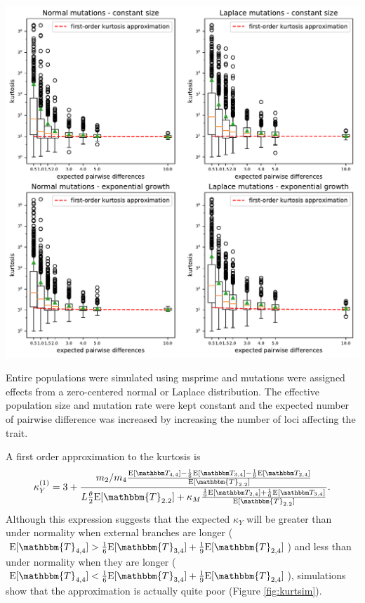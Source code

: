 \begin{center}
  \centering \includegraphics[width=\textwidth]{figures/kurt_sim.pdf}
  \label{fig:kurtsim}
\end{center}
Entire populations were simulated using msprime \citep{Kelleher2015} and
mutations were assigned effects from a zero-centered normal or Laplace
distribution. The effective population size and mutation rate were kept constant
and the expected number of pairwise difference was increased by increasing the
number of loci affecting the trait.

A first order approximation to the kurtosis is
\begin{equation}
    \label{eq:firstord} 
\kappa_Y^{(1)} = 3 + \frac{m_2/m_4 \frac{\CCC}{\E[\mathbbm{T}_{2.2}]}} {L \T \E[\mathbbm{T}_{2.2}]
    + \kappa_M \frac{\BBB}{\E[\mathbbm{T}_{2.2}]}}.
\end{equation}
Although this expression suggests that the expected $\kappa_Y$ will be greater
than under normality when external branches are longer ($\E[\mathbbm{T}_{4,4}] >
\frac{1}{6}\E[\mathbbm{T}_{3,4}] + \frac{1}{9}\E[\mathbbm{T}_{2,4}]$) and less
than under normality when they are longer ($\E[\mathbbm{T}_{4,4}] <
\frac{1}{6}\E[\mathbbm{T}_{3,4}] + \frac{1}{9}\E[\mathbbm{T}_{2,4}]$),
simulations show that the approximation is actually quite poor (Figure
\ref{fig:kurtsim}).
